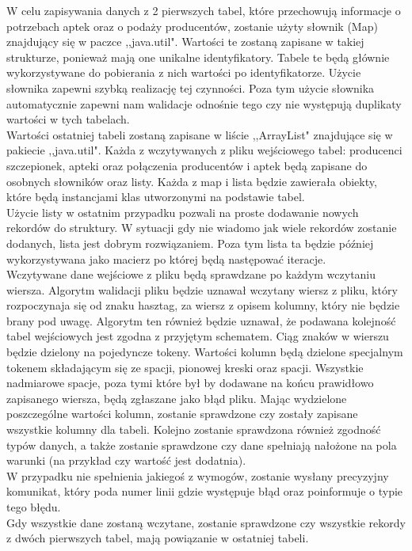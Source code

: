 \documentclass[12pt]{article}
\begin{document}
 W celu zapisywania danych z 2 pierwszych tabel, które przechowują informacje o potrzebach aptek oraz o podaży producentów, zostanie użyty słownik (Map) znajdujący się w paczce ,,java.util". Wartości te zostaną zapisane w takiej strukturze, ponieważ mają one unikalne identyfikatory. Tabele te będą głównie wykorzystywane do pobierania z nich wartości po identyfikatorze. Użycie słownika zapewni szybką realizację tej czynności. Poza tym użycie słownika automatycznie zapewni nam walidacje odnośnie tego czy nie występują duplikaty wartości w tych tabelach. \\
Wartości ostatniej tabeli zostaną zapisane w liście ,,ArrayList" znajdujące się w pakiecie ,,java.util". Każda z wczytywanych z pliku wejściowego tabel: producenci szczepionek, apteki oraz połączenia producentów i aptek będą zapisane do osobnych słowników oraz listy. Każda z map i lista będzie zawierała obiekty, które będą instancjami klas utworzonymi na podstawie tabel. \\
Użycie listy w ostatnim przypadku pozwali na proste dodawanie nowych rekordów do struktury. W sytuacji gdy nie wiadomo jak wiele rekordów zostanie dodanych, lista jest dobrym rozwiązaniem. Poza tym lista ta będzie później wykorzystywana jako macierz po której będą następować iteracje. \\

Wczytywane dane wejściowe z pliku będą sprawdzane po każdym wczytaniu wiersza. Algorytm walidacji pliku będzie uznawał wczytany wiersz z pliku, który rozpoczynaja się od znaku hasztag, za wiersz z opisem kolumny, który nie będzie brany pod uwagę. Algorytm ten również będzie uznawał, że podawana kolejność tabel wejściowych jest zgodna z przyjętym schematem. Ciąg znaków w wierszu będzie dzielony na pojedyncze tokeny. Wartości kolumn będą dzielone specjalnym tokenem składającym się ze spacji, pionowej kreski oraz spacji. Wszystkie nadmiarowe spacje, poza tymi które był by dodawane na końcu prawidłowo zapisanego wiersza, będą zgłaszane jako błąd pliku. Mając wydzielone poszczególne wartości kolumn, zostanie sprawdzone czy zostały zapisane wszystkie kolumny dla tabeli. Kolejno zostanie sprawdzona również zgodność typów danych, a także zostanie sprawdzone czy dane spełniają nałożone na pola warunki (na przykład czy wartość jest dodatnia).\\
 W przypadku nie spełnienia jakiegoś z wymogów, zostanie wysłany precyzyjny komunikat, który poda numer linii gdzie występuje błąd oraz poinformuje o typie tego błędu. \\
Gdy wszystkie dane zostaną wczytane, zostanie sprawdzone czy wszystkie rekordy z dwóch pierwszych tabel, mają powiązanie w ostatniej tabeli.
\end{document}
